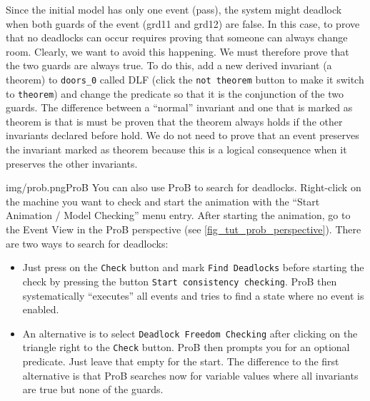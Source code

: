 Since the initial model has only one event (\textsf{pass}), the system might deadlock when both guards of the event (\textsf{grd11} and \textsf{grd12}) are false.
In this case, to prove that no deadlocks can occur requires proving that someone can always change room.
Clearly, we want to avoid this happening. We must therefore prove that the two guards are always true. 
To do this, add a new derived invariant (a theorem) to \texttt{doors\_0} called \textsf{DLF} (click the \texttt{not theorem} button to make it switch to \texttt{theorem})
  and change the predicate so that it is the conjunction of the two guards.
The difference between a ``normal'' invariant and one that is marked as theorem is that is must be proven that the theorem always holds if the other invariants
  declared before hold.
 We do not need to prove that an event preserves the invariant marked as theorem because this is a logical consequence when it preserves the other invariants.

\begin{description}
\INVARIANTS
	\begin{description}
	\end{description}
\end{description}

\begin{rodin-plugin}{img/prob.png}{ProB}%
  You can also use ProB to search for deadlocks.
  Right-click on the machine you want to check and start the animation with the
  ``Start Animation / Model Checking'' menu entry.
  After starting the animation, go to the Event View in the ProB perspective
  (see \ref{fig_tut_prob_perspective}).
  There are two ways to search for deadlocks:
  \begin{itemize}
  \item Just press on the \texttt{Check} button and mark \texttt{Find Deadlocks} before
    starting the check by pressing the button \texttt{Start consistency checking}.
    ProB then systematically ``executes'' all events and tries to find a state where no
    event is enabled.
  \item An alternative is to select \texttt{Deadlock Freedom Checking} after clicking
    on the triangle right to the \texttt{Check} button.
    ProB then prompts you for an optional predicate. Just leave that empty for the start.
    The difference to the first alternative is that ProB searches now for variable values
    where all invariants are true but none of the guards.
  \end{itemize}
\end{rodin-plugin}

